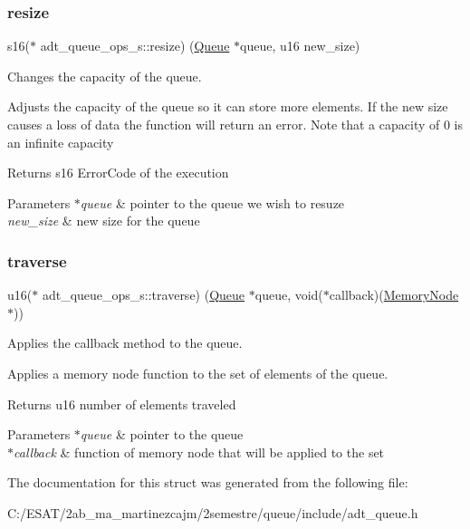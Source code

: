 \subsubsection{\texorpdfstring{resize}{resize}}
{\footnotesize\ttfamily s16($\ast$ adt\+\_\+queue\+\_\+ops\+\_\+s\+::resize) (\hyperlink{structadt__queue__s}{Queue} $\ast$queue, u16 new\+\_\+size)}



Changes the capacity of the queue. 

Adjusts the capacity of the queue so it can store more elements. If the new size causes a loss of data the function will return an error. Note that a capacity of 0 is an infinite capacity

\begin{DoxyReturn}{Returns}
s16 Error\+Code of the execution 
\end{DoxyReturn}

\begin{DoxyParams}{Parameters}
{\em $\ast$queue} & pointer to the queue we wish to resuze \\
\hline
{\em new\+\_\+size} & new size for the queue \\
\hline
\end{DoxyParams}
\mbox{\label{structadt__queue__ops__s_aa5fc9dd9e94695d7b543eb3487b5ba70}} 
\subsubsection{\texorpdfstring{traverse}{traverse}}
{\footnotesize\ttfamily u16($\ast$ adt\+\_\+queue\+\_\+ops\+\_\+s\+::traverse) (\hyperlink{structadt__queue__s}{Queue} $\ast$queue, void($\ast$callback)(\hyperlink{structmemory__node__s}{Memory\+Node} $\ast$))}



Applies the callback method to the queue. 

Applies a memory node function to the set of elements of the queue.

\begin{DoxyReturn}{Returns}
u16 number of elements traveled 
\end{DoxyReturn}

\begin{DoxyParams}{Parameters}
{\em $\ast$queue} & pointer to the queue \\
\hline
{\em $\ast$callback} & function of memory node that will be applied to the set \\
\hline
\end{DoxyParams}


The documentation for this struct was generated from the following file\+:\begin{DoxyCompactItemize}
\item 
C\+:/\+E\+S\+A\+T/2ab\+\_\+ma\+\_\+martinezcajm/2semestre/queue/include/adt\+\_\+queue.\+h\end{DoxyCompactItemize}
